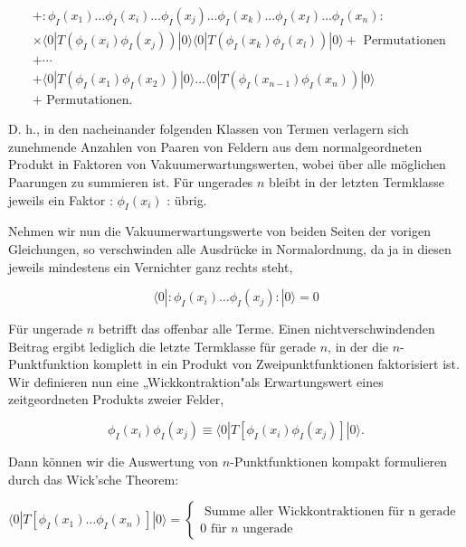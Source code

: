 \documentclass[10pt, letterpaper]{article}
\begin{document}
$$
\begin{aligned}
& +: \phi_{I}\left(x_{1}\right) \ldots \phi_{I}\left(x_{i}\right) \ldots \phi_{I}\left(x_{j}\right) \ldots \phi_{I}\left(x_{k}\right) \ldots \phi_{I}\left(x_{I}\right) \ldots \phi_{I}\left(x_{n}\right): \\
& \times\langle 0| T\left(\phi_{I}\left(x_{i}\right) \phi_{I}\left(x_{j}\right)\right)|0\rangle\langle 0| T\left(\phi_{I}\left(x_{k}\right) \phi_{I}\left(x_{l}\right)\right)|0\rangle+\text { Permutationen } \\
& +\cdots \\
& +\langle 0| T\left(\phi_{I}\left(x_{1}\right) \phi_{I}\left(x_{2}\right)\right)|0\rangle \ldots\langle 0| T\left(\phi_{I}\left(x_{n-1}\right) \phi_{I}\left(x_{n}\right)\right)|0\rangle \\
& + \text { Permutationen. }
\end{aligned}
$$

D. h., in den nacheinander folgenden Klassen von Termen verlagern sich zunehmende Anzahlen von Paaren von Feldern aus dem normalgeordneten Produkt in Faktoren von Vakuumerwartungswerten, wobei über alle möglichen Paarungen zu summieren ist. Für ungerades $n$ bleibt in der letzten Termklasse jeweils ein Faktor : $\phi_{I}\left(x_{i}\right)$ : übrig.

Nehmen wir nun die Vakuumerwartungswerte von beiden Seiten der vorigen Gleichungen, so verschwinden alle Ausdrücke in Normalordnung, da ja in diesen jeweils mindestens ein Vernichter ganz rechts steht,

$$
\langle 0|: \phi_{I}\left(x_{i}\right) \ldots \phi_{I}\left(x_{j}\right):|0\rangle=0
$$

Für ungerade $n$ betrifft das offenbar alle Terme. Einen nichtverschwindenden Beitrag ergibt lediglich die letzte Termklasse für gerade $n$, in der die $n$-Punktfunktion komplett in ein Produkt von Zweipunktfunktionen faktorisiert ist. Wir definieren nun eine „Wickkontraktion"als Erwartungswert eines zeitgeordneten Produkts zweier Felder,

$$
\phi_{I}\left(x_{i}\right) \phi_{I}\left(x_{j}\right) \equiv\langle 0| T\left[\phi_{I}\left(x_{i}\right) \phi_{I}\left(x_{j}\right)\right]|0\rangle .
$$

Dann können wir die Auswertung von $n$-Punktfunktionen kompakt formulieren durch das Wick'sche Theorem:

$$
\langle 0| T\left[\phi_{I}\left(x_{1}\right) \ldots \phi_{I}\left(x_{n}\right)\right]|0\rangle=\left\{\begin{array}{l}
\text { Summe aller Wickkontraktionen für } \mathrm{n} \text { gerade } \\
0 \text { für } n \text { ungerade }
\end{array}\right.
$$
\end{document}
